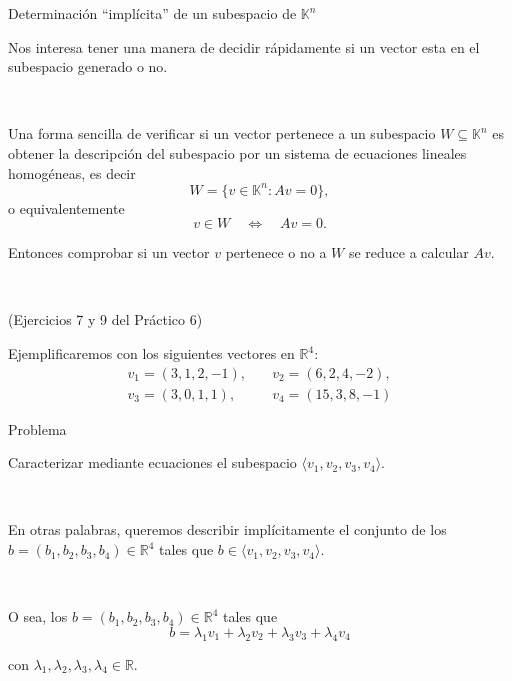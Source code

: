 \documentclass[handout]{beamer} %
\newcommand{\R}{\mathbb R}
\newcommand{\K}{\mathbb K}
\begin{document}
    \begin{frame}{Determinación ``implícita'' de un subespacio de $\K^n$}
    
        Nos interesa tener una manera de decidir rápidamente si un vector esta en el subespacio generado o no.
        \pause

        \
        
        Una forma sencilla de verificar si un vector pertenece a un subespacio $W \subseteq\K^n$ es obtener la descripción del  subespacio por un sistema de ecuaciones lineales homogéneas,  es decir 
        \begin{equation*}
            W = \{v \in \K^n: Av =0\},
        \end{equation*} 
        o equivalentemente
        \begin{equation*}
            v \in W \quad \Leftrightarrow \quad Av =0.
        \end{equation*} 
        
        Entonces comprobar si un vector $v$ pertenece o no a $W$  se reduce a calcular $Av$. 
        \pause

        \
        
        (Ejercicios 7 y 9 del Pr\'actico 6)
        \vskip 2cm
        \end{frame}
        
        
        \begin{frame}
        Ejemplificaremos con los siguientes vectores en $\R^4$:
        \begin{align*}
        v_1=(3,1,2,-1),&\quad
        v_2=(6,2,4,-2),\\
        v_3=(3,0,1,1),&\quad
        v_4=(15,3,8,-1)
        \end{align*}
        \pause

        \begin{exampleblock}{Problema}\pause
        
        Caracterizar mediante ecuaciones el subespacio $\langle v_1, v_2, v_3, v_4\rangle$.
        
        \pause
        
        \
        
        En otras palabras, queremos describir implícitamente el conjunto de los $b=(b_1,b_2,b_3,b_4)
        \in\R^4$ tales que $b\in\langle v_1, v_2, v_3, v_4\rangle$.
        
        \

        \pause
        O sea, los $b=(b_1,b_2,b_3,b_4)
        \in\R^4$ tales que 
        \begin{equation*}
            b=\lambda_1v_1+\lambda_2v_2+\lambda_3v_3+\lambda_4v_4 \tag{*}
        \end{equation*}
        
        
        con $\lambda_1,\lambda_2,\lambda_3,\lambda_4\in\R$.
        \end{exampleblock}
        \end{frame}
        
\end{document}
